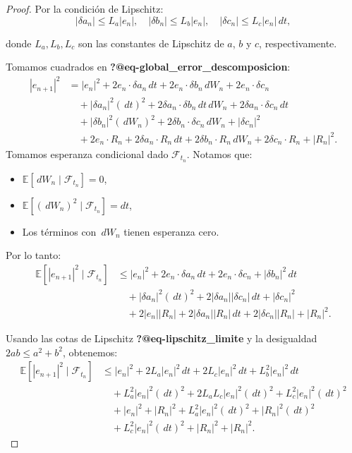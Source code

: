 \documentclass[
  spanish,
  us-letterpaper,
]{scrreprt}
\providecommand{\tightlist}{%
  \setlength{\itemsep}{0pt}\setlength{\parskip}{0pt}}
\theoremstyle{plain}
\theoremstyle{plain}
\theoremstyle{definition}
\theoremstyle{remark}
\begin{document}
\begin{proof}
Por la condición de Lipschitz:
\[|\delta a_n| \leq L_a |e_n|, \quad |\delta b_n| \leq L_b |e_n|, \quad |\delta c_n| \leq L_c |e_n| \, dt,\]

donde \(L_a, L_b, L_c\) son las constantes de Lipschitz de \(a\), \(b\)
y \(c\), respectivamente.

Tomamos cuadrados en \textbf{?@eq-global\_error\_descomposicion}:
\[\begin{aligned}
|e_{n+1}|^2 &= |e_n|^2 + 2e_n \cdot \delta a_n \, dt + 2e_n \cdot \delta b_n \, dW_n + 2e_n \cdot \delta c_n \\
&\quad + |\delta a_n|^2 (\, dt)^2 + 2\delta a_n \cdot \delta b_n \, dt \, dW_n + 2\delta a_n \cdot \delta c_n \, dt \\
&\quad + |\delta b_n|^2 (\, dW_n)^2 + 2\delta b_n \cdot \delta c_n \, dW_n + |\delta c_n|^2 \\
&\quad + 2e_n \cdot R_n + 2\delta a_n \cdot R_n \, dt + 2\delta b_n \cdot R_n \, dW_n + 2\delta c_n \cdot R_n + |R_n|^2.
\end{aligned}\] Tomamos esperanza condicional dado
\(\mathcal{F}_{t_n}\). Notamos que:

\begin{itemize}
\tightlist
\item
  \(\mathbb{E}[\,dW_n \mid \mathcal{F}_{t_n}] = 0\),
\item
  \(\mathbb{E}[(\,dW_n)^2 \mid \mathcal{F}_{t_n}] = dt\),
\item
  Los términos con \(\,dW_n\) tienen esperanza cero.
\end{itemize}

Por lo tanto: \[\begin{aligned}
\mathbb{E}[|e_{n+1}|^2 \mid \mathcal{F}_{t_n}] &\leq |e_n|^2 + 2e_n \cdot \delta a_n \, dt + 2e_n \cdot \delta c_n + |\delta b_n|^2 \, dt \\
&\quad + |\delta a_n|^2 (\, dt)^2 + 2|\delta a_n| |\delta c_n| \, dt + |\delta c_n|^2 \\
&\quad + 2|e_n| |R_n| + 2|\delta a_n| |R_n| \, dt + 2|\delta c_n| |R_n| + |R_n|^2.
\end{aligned}\]

Usando las cotas de Lipschitz \textbf{?@eq-lipschitz\_limite} y la
desigualdad \(2ab \leq a^2 + b^2\), obtenemos: \[\begin{aligned}
\mathbb{E}[|e_{n+1}|^2 \mid \mathcal{F}_{t_n}] &\leq |e_n|^2 + 2L_a |e_n|^2 \, dt + 2L_c |e_n|^2 \, dt + L_b^2 |e_n|^2 \, dt \\
&\quad + L_a^2 |e_n|^2 (\, dt)^2 + 2L_a L_c |e_n|^2 (\, dt)^2 + L_c^2 |e_n|^2 (\, dt)^2 \\
&\quad + |e_n|^2 + |R_n|^2 + L_a^2 |e_n|^2 (\, dt)^2 + |R_n|^2 (\, dt)^2 \\
&\quad + L_c^2 |e_n|^2 (\, dt)^2 + |R_n|^2 + |R_n|^2.
\end{aligned}\]


\end{proof}
\end{document}
